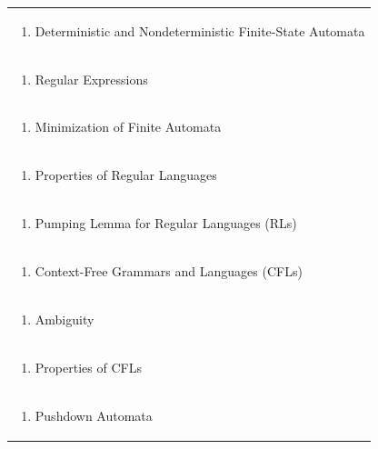 \documentclass[11pt]{article}
\begin{document}
\begin{center}
\begin{longtable}{|p{4cm}|p{4cm}|p{4cm}|p{4cm}|}
\multicolumn{4}{|p{\dimexpr 16cm + 6\tabcolsep\relax}|}{\begin{enumerate}[start=2]\item Deterministic and Nondeterministic Finite-State Automata\end{enumerate}}\\
\multicolumn{4}{|p{\dimexpr 16cm + 6\tabcolsep\relax}|}{\begin{enumerate}[start=3]\item Regular Expressions\end{enumerate}}\\
\multicolumn{4}{|p{\dimexpr 16cm + 6\tabcolsep\relax}|}{\begin{enumerate}[start=4]\item Minimization of Finite Automata\end{enumerate}}\\
\multicolumn{4}{|p{\dimexpr 16cm + 6\tabcolsep\relax}|}{\begin{enumerate}[start=5]\item Properties of Regular Languages\end{enumerate}}\\
\multicolumn{4}{|p{\dimexpr 16cm + 6\tabcolsep\relax}|}{\begin{enumerate}[start=6]\item Pumping Lemma for Regular Languages (RLs)\end{enumerate}}\\
\multicolumn{4}{|p{\dimexpr 16cm + 6\tabcolsep\relax}|}{\begin{enumerate}[start=7]\item Context-Free Grammars and Languages (CFLs)\end{enumerate}}\\
\multicolumn{4}{|p{\dimexpr 16cm + 6\tabcolsep\relax}|}{\begin{enumerate}[start=8]\item Ambiguity\end{enumerate}}\\
\multicolumn{4}{|p{\dimexpr 16cm + 6\tabcolsep\relax}|}{\begin{enumerate}[start=9]\item Properties of CFLs\end{enumerate}}\\
\multicolumn{4}{|p{\dimexpr 16cm + 6\tabcolsep\relax}|}{\begin{enumerate}[start=10]\item Pushdown Automata\end{enumerate}}\\

\end{longtable}
\end{center}
\end{document}
